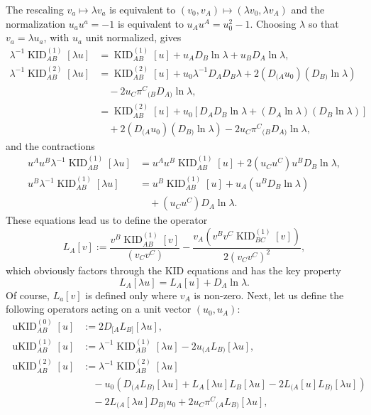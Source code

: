 \documentclass[a4paper]{article}
\theoremstyle{remark}
\newcommand{\la}{\lambda}
\newcommand{\KIDi}{\operatorname{KID}^{(1)}}
\newcommand{\KIDii}{\operatorname{KID}^{(2)}}
\newcommand{\uKIDo}{\operatorname{uKID}^{(0)}}
\newcommand{\uKIDi}{\operatorname{uKID}^{(1)}}
\newcommand{\uKIDii}{\operatorname{uKID}^{(2)}}
\begin{document}
The rescaling $v_a \mapsto \la v_a$ is equivalent to $(v_0, v_A)
\mapsto (\la v_0, \la v_A)$ and the normalization $u_a u^a = -1$ is
equivalent to $u_A u^A = u_0^2 - 1$. Choosing $\la$ so that $v_a =
\la u_a$, with $u_a$ unit normalized, gives%
\begin{equation} \label{eq:KID-lu}
\begin{aligned}
	\la^{-1} \KIDi_{AB}[\la u]
	&= \KIDi_{AB}[u] + u_A D_B \ln\la + u_B D_A \ln\la ,
	\\
	\la^{-1} \KIDii_{AB}[\la u]
	&= \KIDii_{AB}[u] + u_0 \la^{-1} D_A D_B \la
		+ 2 (D_{(A} u_0) (D_{B)} \ln\la)
	\\ & \quad {}
		- 2 u_C \pi^C{}_{(B} D_{A)} \ln\la
	,
	\\
	&= \KIDii_{AB}[u] + u_0 [D_A D_B \ln\la + (D_A\ln\la) (D_B\ln\la)]
	\\ & \quad {}
		+ 2 (D_{(A} u_0) (D_{B)} \ln\la)
		- 2 u_C \pi^C{}_{(B} D_{A)} \ln\la
	,
\end{aligned}
\end{equation}
and the contractions
\begin{equation}
\begin{aligned}
	u^A u^B \la^{-1} \KIDi_{AB}[\la u]
	&= u^A u^B \KIDi_{AB}[u] + 2 (u_C u^C) u^B D_B \ln\la
	,
	\\
	u^B \la^{-1} \KIDi_{AB}[\la u]
	&= u^B \KIDi_{AB}[u] + u_A (u^B D_B \ln\la)
	\\ & \quad {}
		+ (u_C u^C) D_A \ln\la
	.
\end{aligned}
\end{equation}
These equations lead us to define the operator
\begin{equation} \label{eq:uKID-L}
	L_{A}[v] := 
	\frac{v^B \KIDi_{AB}[v]}{(v_C v^C)}
		- \frac{v_A (v^B v^C \KIDi_{BC}[v])}{2(v_C v^C)^2}
	,
\end{equation}
which obviously factors through the KID equations and has the key property
\begin{equation}
	L_A[\la u] = L_A[u] + D_A \ln\la .
\end{equation}
Of course, $L_a[v]$ is defined only where $v_A$ is non-zero.
Next, let us define the following operators acting on a unit vector
$(u_0,u_A)$:
\begin{equation} \label{eq:uKID-def}
\begin{aligned}
	\uKIDo_{AB}[u] &:= 2D_{[A} L_{B]}[\la u] , \\
	\uKIDi_{AB}[u] &:= \la^{-1} \KIDi_{AB}[\la u] - 2 u_{(A} L_{B)}[\la u] , \\
	\uKIDii_{AB}[u] &:= \la^{-1} \KIDii_{AB}[\la u]
		\\ &\quad {}
		- u_0 \left(D_{(A} L_{B)}[\la u] + L_A[\la u] L_B[\la u] - 2 L_{(A}[u] L_{B)}[\la u]\right)
		\\ &\quad {}
		- 2L_{(A}[\la u] D_{B)} u_0
		+ 2u_C \pi^C{}_{(A} L_{B)}[\la u] ,
\end{aligned}
\end{equation}
\end{document}
